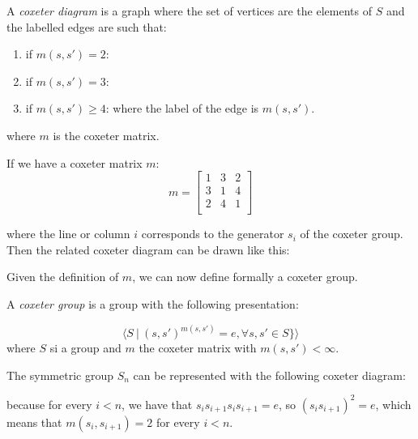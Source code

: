 \begin{definition}
  A \emph{coxeter diagram} is a graph where the set of vertices are the elements of $S$ and
  the labelled edges are such that:
  \begin{enumerate}
    \item if $m(s,s') = 2$:\ 
    \item if $m(s,s') = 3$:  
    \item if $m(s,s') \geq 4$:  where the label of the edge is $m(s,s')$.
  \end{enumerate}

  where $m$ is the coxeter matrix.
\end{definition}

\begin{example}
	If we have a coxeter matrix $m$:
    \begin{equation}
      m =
    \begin{bmatrix}
    1 & 3 & 2\\
    3 & 1 & 4\\
    2 & 4 & 1\\
    \end{bmatrix}
    \end{equation}

  where the line or column $i$ corresponds to the generator $s_i$ of the coxeter group. Then the related coxeter diagram can be drawn like this:

\end{example}

Given the definition of $m$, we can now define formally a coxeter group.

\begin{definition}
A \emph{coxeter group} is a group with the following presentation:

\begin{equation}
  \langle S\  |\  (s, s')^{m(s,s')} = e, \forall s, s' \in S\} \rangle
\end{equation}
where $S$ si a group and $m$ the coxeter matrix with $m(s,s') < \infty$.

\end{definition}

\begin{example}
  The symmetric group $S_n$ can be represented with the following coxeter diagram:
  \begin{center}
  \end{center}

  because for every $i < n$, we have that $s_is_{i+1}s_is_{i+1} = e$, so $(s_is_{i+1})^2 = e$, which means that
  $m(s_i, s_{i+1}) = 2$ for every $i < n$.
\end{example}

